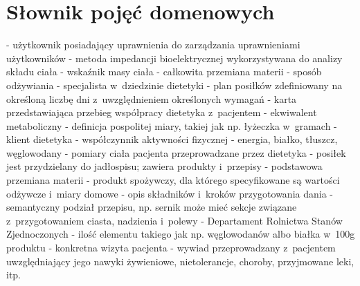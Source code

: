 \section{Słownik pojęć domenowych}\label{sec:dictionary}
\begin{itemize}[series=atr, wide, align=left, leftmargin=190pt]
    - użytkownik posiadający uprawnienia do zarządzania uprawnieniami użytkowników
    - metoda impedancji bioelektrycznej wykorzystywana do analizy składu ciała%
    - wskaźnik masy ciała%
    - całkowita przemiana materii %
    - sposób odżywiania%
    - specjalista w~dziedzinie dietetyki
    - plan posiłków zdefiniowany na określoną liczbę dni z~uwzględnieniem określonych wymagań
    - karta przedstawiająca przebieg współpracy dietetyka z~pacjentem
    - ekwiwalent metaboliczny%
    - definicja pospolitej miary, takiej jak np. łyżeczka w~gramach
    - klient dietetyka
    - współczynnik aktywności fizycznej
    - energia, białko, tłuszcz, węglowodany%
    - pomiary ciała pacjenta przeprowadzane przez dietetyka
    - posiłek jest przydzielany do jadłospisu; zawiera produkty i~przepisy
    - podstawowa przemiana materii %
    - produkt spożywczy, dla którego specyfikowane są wartości odżywcze i~miary domowe
    - opis składników i~kroków przygotowania dania
    - semantyczny podział przepisu, np. sernik może mieć sekcje związane z~przygotowaniem ciasta, nadzienia i~polewy
    - Departament Rolnictwa Stanów Zjednoczonych%
    - ilość elementu takiego jak np. węglowodanów albo białka w~100g produktu
    - konkretna wizyta pacjenta
    - wywiad przeprowadzany z~pacjentem uwzględniający jego nawyki żywieniowe, nietolerancje, choroby, przyjmowane leki, itp.
\end{itemize}

